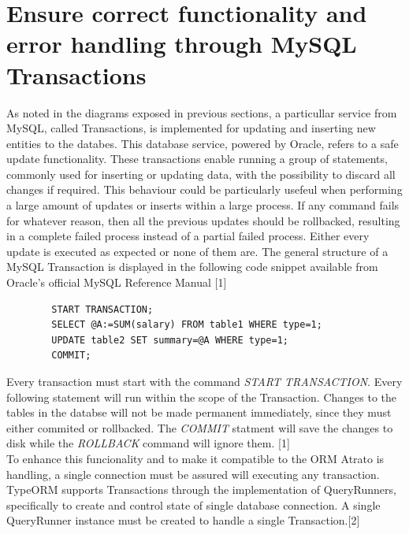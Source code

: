 \section{Ensure correct functionality and error handling through MySQL Transactions}

As noted in the diagrams exposed in previous sections, a particullar service from MySQL, called Transactions, is implemented for updating and inserting new entities to the databes. This database service, powered by Oracle, refers to a safe update functionality. These transactions enable running a group of statements, commonly used for inserting or updating data, with the possibility to discard all changes if required. This behaviour could be particularly usefeul when performing a large amount of updates or inserts within a large process. If any command fails for whatever reason, then all the previous updates should be rollbacked, resulting in a complete failed process instead of a partial failed process. Either every update is executed as expected or none of them are. The general structure of a MySQL Transaction is displayed in the following code snippet available from Oracle's official MySQL Reference Manual [1]

\begin{center}
    \begin{verbatim}
        START TRANSACTION;
        SELECT @A:=SUM(salary) FROM table1 WHERE type=1;
        UPDATE table2 SET summary=@A WHERE type=1;
        COMMIT;
    \end{verbatim}
\end{center}

Every transaction must start with the command \textit{START TRANSACTION}. Every following statement will run within the scope of the Transaction. Changes to the tables in the databse will not be made permanent immediately, since they must either commited or rollbacked. The \textit{COMMIT} statment will save the changes to disk while the \textit{ROLLBACK} command will ignore them. [1]\\

To enhance this funcionality and to make it compatible to the ORM Atrato is handling, a single connection must be assured will executing any transaction. TypeORM supports Transactions through the implementation of QueryRunners, specifically to create and control state of single database connection. A single QueryRunner instance must be created to handle a single Transaction.[2]\\ 


